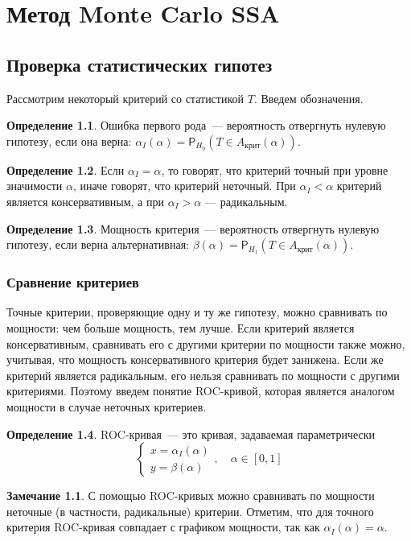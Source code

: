 \documentclass[specialist,
substylefile = spbu_report.rtx,
subf,href,colorlinks=true, 12pt]{disser}
\theoremstyle{definition}
\newtheorem{definition}{Определение}[section]
\newtheorem{remark}{Замечание}[section]
\begin{document}
\chapter{Метод Monte Carlo SSA}

\section{Проверка статистических гипотез}
Рассмотрим некоторый критерий со статистикой $T$. Введем обозначения.
\begin{definition}
	Ошибка первого рода~--- вероятность отвергнуть нулевую гипотезу, если она верна: $\alpha_I(\alpha)=\mathsf P_{H_0}(T\in A_\text{крит}(\alpha))$.
\end{definition}
\begin{definition}
	Если $\alpha_I=\alpha$, то говорят, что критерий точный при уровне значимости $\alpha$, иначе говорят, что критерий неточный. При $\alpha_I<\alpha$ критерий является консервативным, а при $\alpha_I>\alpha$ --- радикальным.
\end{definition}
\begin{definition}
	Мощность критерия~--- вероятность отвергнуть нулевую гипотезу, если верна альтернативная: $\beta(\alpha)=\mathsf P_{H_1}(T\in A_\text{крит}(\alpha))$.
\end{definition}
\subsection{Сравнение критериев}
Точные критерии, проверяющие одну и ту же гипотезу, можно сравнивать по мощности: чем больше мощность, тем лучше. Если критерий является консервативным, сравнивать его с другими критерии по мощности также можно, учитывая, что мощность консервативного критерия будет занижена. Если же критерий является радикальным, его нельзя сравнивать по мощности с другими критериями. Поэтому введем понятие ROC-кривой, которая является аналогом мощности в случае неточных критериев.
\begin{definition}
	ROC-кривая~--- это кривая, задаваемая параметрически
	\[
		\begin{cases}
			x=\alpha_I(\alpha) \\
			y=\beta(\alpha)
		\end{cases},\quad \alpha\in[0,1]
	\]
\end{definition}
\begin{remark}
	С помощью ROC-кривых можно сравнивать по мощности неточные (в частности, радикальные) критерии. Отметим, что для точного критерия ROC-кривая совпадает с графиком мощности, так как $\alpha_I(\alpha)=\alpha$.
\end{remark}
\end{document}
